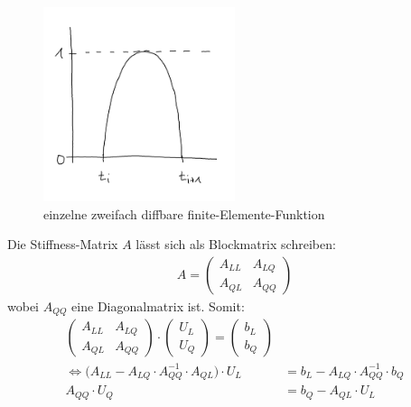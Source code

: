 \begin{figure}[h!]
	\begin{center}
		\includegraphics[width=0.5\textwidth]{./pics/Sketch2.png}
		\caption{einzelne zweifach diffbare finite-Elemente-Funktion}
		\label{AbbHutFunktionen}
	\end{center}
\end{figure}

Die Stiffness-Matrix $A$ lässt sich als Blockmatrix schreiben:
\begin{align*}
A=\begin{pmatrix}
A_{LL} & A_{LQ}\\
A_{QL} & A_{QQ}
\end{pmatrix}
\end{align*}
wobei $A_{QQ}$ eine Diagonalmatrix ist. Somit:
\begin{align*}
\begin{pmatrix}
A_{LL} & A_{LQ}\\
A_{QL} & A_{QQ}
\end{pmatrix}\cdot\begin{pmatrix}
U_L\\ U_Q
\end{pmatrix}=
\begin{pmatrix}
b_L\\ b_Q
\end{pmatrix}\\
\Longleftrightarrow \big(A_{LL}-A_{LQ}\cdot A^{-1}_{QQ}\cdot A_{QL}\big)\cdot U_L&= b_L-A_{LQ}\cdot A^{-1}_{QQ}\cdot b_Q\\
A_{QQ}\cdot U_Q&= b_Q-A_{QL}\cdot U_L
\end{align*}

